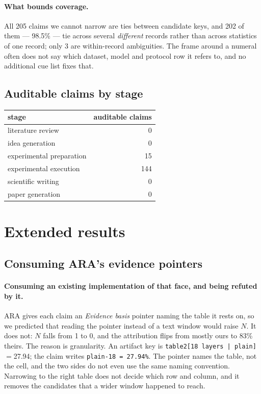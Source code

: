 \documentclass[10pt]{article}
\newcommand{\RM}[1]{{#1}}
\begin{document}
\paragraph{What bounds coverage.} All \RM{205} claims we cannot narrow are ties
between candidate keys, and \RM{202} of them --- \RM{98.5\%} --- tie across
several \emph{different} records rather than across statistics of one record;
only \RM{3} are within-record ambiguities. The frame
around a numeral often does not say which dataset, model and protocol row it
refers to, and no additional cue list fixes that.



\subsection{Auditable claims by stage}

\begin{center}
\small
\begin{tabular}{@{}lr@{}}
\toprule
stage & auditable claims \\
\midrule
literature review & \RM{0} \\
idea generation & \RM{0} \\
experimental preparation & \RM{15} \\
experimental execution & \RM{144} \\
scientific writing & \RM{0} \\
paper generation & \RM{0} \\
\bottomrule
\end{tabular}
\end{center}


\section{Extended results}
\label{app:extended}

\subsection{Consuming ARA's evidence pointers}

\paragraph{Consuming an existing implementation of that face, and being refuted
by it.} ARA gives each claim an \emph{Evidence basis} pointer naming the table
it rests on, so we predicted that reading the pointer instead of a text window
would raise $N$. It does not: $N$ falls from \RM{1} to \RM{0}, and the
attribution flips from mostly ours to \RM{83\%} theirs. The reason is
granularity. An artifact key is
\texttt{table2[18\,layers\,|\,plain]}$=$27.94; the claim writes
\texttt{plain-18\,=\,27.94\%}. The pointer names the table, not the cell, and
the two sides do not even use the same naming convention. Narrowing to the right
table does not decide which row and column, and it removes the candidates that
a wider window happened to reach.
\end{document}
